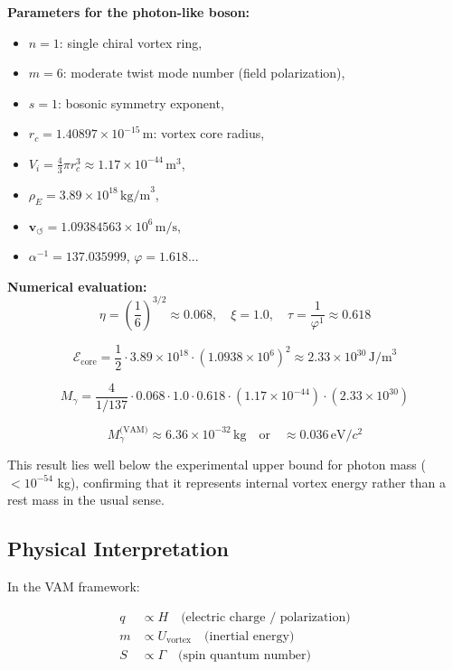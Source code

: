 \documentclass[preprint]{revtex4-2}
\begin{document}
\noindent
\textbf{Parameters for the photon-like boson:}
\begin{itemize}
    \item \(n = 1\): single chiral vortex ring,
    \item \(m = 6\): moderate twist mode number (field polarization),
    \item \(s = 1\): bosonic symmetry exponent,
    \item \(r_c = 1.40897 \times 10^{-15} \, \text{m}\): vortex core radius,
    \item \(V_i = \frac{4}{3} \pi r_c^3 \approx 1.17 \times 10^{-44} \, \text{m}^3\),
    \item \(\rho_{\scriptscriptstyle\boldsymbol\!E}= 3.89 \times 10^{18} \, \text{kg/m}^3\),
    \item \(\mathbf{v}_{\scriptscriptstyle\boldsymbol{\circlearrowleft}} = 1.09384563 \times 10^6 \, \text{m/s}\),
    \item \(\alpha^{-1} = 137.035999\), \quad \(\varphi = 1.618...\)
\end{itemize}

\noindent
\textbf{Numerical evaluation:}
\[
\eta = \left( \frac{1}{6} \right)^{3/2} \approx 0.068,
\quad
\xi = 1.0,
\quad
\tau = \frac{1}{\varphi^1} \approx 0.618
\]

\[
\mathcal{E}_\text{core} = \frac{1}{2} \cdot 3.89 \times 10^{18} \cdot (1.0938 \times 10^6)^2 \approx 2.33 \times 10^{30} \, \text{J/m}^3
\]

\[
M_\gamma = \frac{4}{1/137} \cdot 0.068 \cdot 1.0 \cdot 0.618 \cdot (1.17 \times 10^{-44}) \cdot (2.33 \times 10^{30})
\]

\[
\boxed{
M_\gamma^\text{(VAM)} \approx 6.36 \times 10^{-32} \, \text{kg}
}
\quad \text{or} \quad
\boxed{
\approx 0.036 \, \text{eV}/c^2
}
\]

This result lies well below the experimental upper bound for photon mass (\(< 10^{-54}\) kg), confirming that it represents internal vortex energy rather than a rest mass in the usual sense.

\subsection{Physical Interpretation}

In the VAM framework:

\begin{align*}
q &\propto H \quad \text{(electric charge / polarization)} \\
m &\propto U_{\text{vortex}} \quad \text{(inertial energy)} \\
S &\propto \Gamma \quad \text{(spin quantum number)}
\end{align*}
\end{document}
